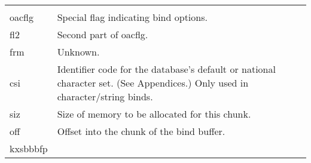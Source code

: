 \begin{longtable}[]{@{}l|l@{}}
\begin{minipage}[t]{0.65\columnwidth}
\end{minipage}\tabularnewline
\begin{minipage}[t]{0.14\columnwidth}\raggedright\strut
oacflg\strut
\end{minipage} & \begin{minipage}[t]{0.65\columnwidth}\raggedright\strut
Special flag indicating bind options.\strut
\end{minipage}\tabularnewline
\begin{minipage}[t]{0.14\columnwidth}\raggedright\strut
fl2\strut
\end{minipage} & \begin{minipage}[t]{0.65\columnwidth}\raggedright\strut
Second part of oacflg.\strut
\end{minipage}\tabularnewline
\begin{minipage}[t]{0.14\columnwidth}\raggedright\strut
frm\strut
\end{minipage} & \begin{minipage}[t]{0.65\columnwidth}\raggedright\strut
Unknown.\strut
\end{minipage}\tabularnewline
\begin{minipage}[t]{0.14\columnwidth}\raggedright\strut
csi\strut
\end{minipage} & \begin{minipage}[t]{0.65\columnwidth}\raggedright\strut
Identifier code for the database's default or national character set.
(See Appendices.) Only used in character/string binds.\strut
\end{minipage}\tabularnewline
\begin{minipage}[t]{0.14\columnwidth}\raggedright\strut
siz\strut
\end{minipage} & \begin{minipage}[t]{0.65\columnwidth}\raggedright\strut
Size of memory to be allocated for this chunk.\strut
\end{minipage}\tabularnewline
\begin{minipage}[t]{0.14\columnwidth}\raggedright\strut
off\strut
\end{minipage} & \begin{minipage}[t]{0.65\columnwidth}\raggedright\strut
Offset into the chunk of the bind buffer.\strut
\end{minipage}\tabularnewline
\begin{minipage}[t]{0.14\columnwidth}\raggedright\strut
kxsbbbfp\strut
\end{minipage} & \begin{minipage}[t]{0.65\columnwidth}\raggedright\strut

\end{minipage}
\end{longtable}
